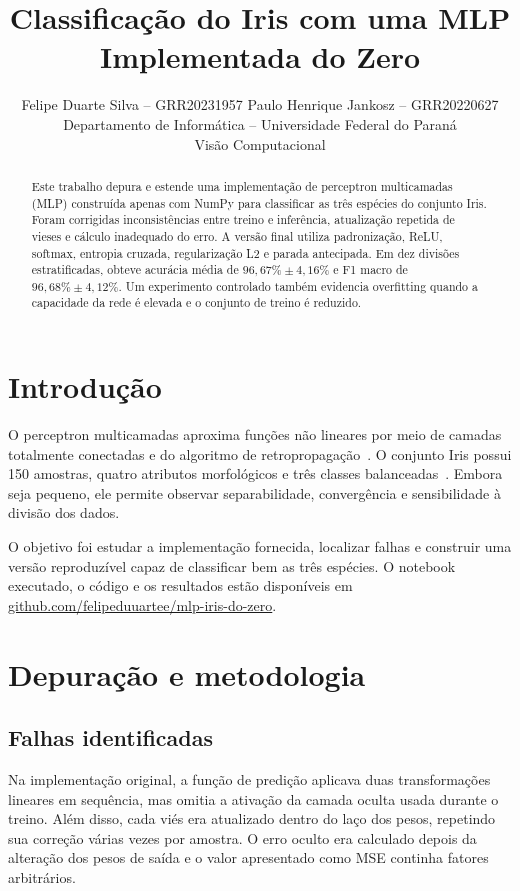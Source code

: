 \documentclass[10pt,twocolumn]{article}
\title{\vspace{-1.1cm}\textbf{Classificação do Iris com uma MLP Implementada do Zero}\vspace{-0.35cm}}
\author{\small Felipe Duarte Silva -- GRR20231957 \qquad Paulo Henrique Jankosz -- GRR20220627\\
\small Departamento de Informática -- Universidade Federal do Paraná\\
\small Visão Computacional}
\date{}
\begin{document}
\maketitle
\vspace{-0.9cm}

\begin{abstract}
Este trabalho depura e estende uma implementação de perceptron multicamadas (MLP) construída apenas com NumPy para classificar as três espécies do conjunto Iris. Foram corrigidas inconsistências entre treino e inferência, atualização repetida de vieses e cálculo inadequado do erro. A versão final utiliza padronização, ReLU, softmax, entropia cruzada, regularização L2 e parada antecipada. Em dez divisões estratificadas, obteve acurácia média de $96{,}67\% \pm 4{,}16\%$ e F1 macro de $96{,}68\% \pm 4{,}12\%$. Um experimento controlado também evidencia overfitting quando a capacidade da rede é elevada e o conjunto de treino é reduzido.
\end{abstract}

\section{Introdução}

O perceptron multicamadas aproxima funções não lineares por meio de camadas totalmente conectadas e do algoritmo de retropropagação~\cite{rumelhart1986}. O conjunto Iris possui 150 amostras, quatro atributos morfológicos e três classes balanceadas~\cite{fisher1936}. Embora seja pequeno, ele permite observar separabilidade, convergência e sensibilidade à divisão dos dados.

O objetivo foi estudar a implementação fornecida, localizar falhas e construir uma versão reproduzível capaz de classificar bem as três espécies. O notebook executado, o código e os resultados estão disponíveis em \href{https://github.com/felipeduuartee/mlp-iris-do-zero}{github.com/felipeduuartee/mlp-iris-do-zero}.

\section{Depuração e metodologia}

\subsection{Falhas identificadas}

Na implementação original, a função de predição aplicava duas transformações lineares em sequência, mas omitia a ativação da camada oculta usada durante o treino. Além disso, cada viés era atualizado dentro do laço dos pesos, repetindo sua correção várias vezes por amostra. O erro oculto era calculado depois da alteração dos pesos de saída e o valor apresentado como MSE continha fatores arbitrários.
\end{document}
